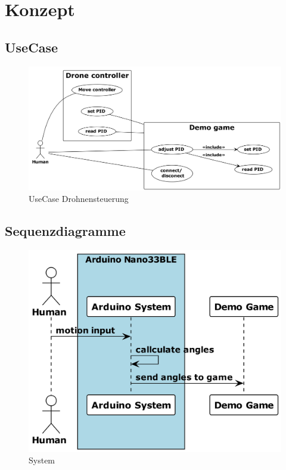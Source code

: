 \section{Konzept}

\subsection{UseCase}
\begin{figure}[H]
  \begin{center}
    \includegraphics[width=0.9\linewidth]{content/diagrams/out/usecase/usecaseControl.png}
    \caption{UseCase Drohnensteuerung}
  \end{center}
\end{figure}

\subsection{Sequenzdiagramme}
\begin{figure}[H]
  \begin{center}
    \includegraphics[width=0.5\linewidth]{content/diagrams/out/sequence/system.png}
    \caption{System}
  \end{center}
\end{figure}

